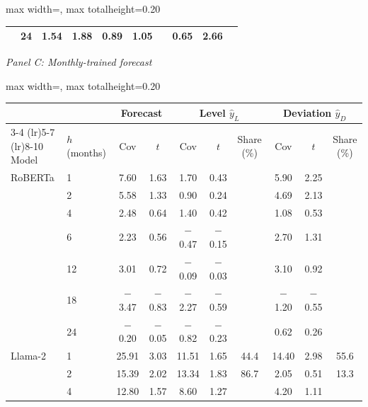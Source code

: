 \begin{table}[htbp]
{\begin{adjustbox}{max width=\linewidth, max totalheight=0.20\textheight}
\begin{tabular}{llcccccccc}
 & 24 & \phantom{$-$}1.54 & \phantom{$-$}1.88 & \phantom{$-$}0.89 & \phantom{$-$}1.05 &  & \phantom{$-$}0.65 & \phantom{$-$}2.66 &  \\
\bottomrule
\end{tabular}
\end{adjustbox}
\par\medskip
\textit{Panel C: Monthly-trained forecast}\\[2pt]
\begin{adjustbox}{max width=\linewidth, max totalheight=0.20\textheight}
\begin{tabular}{llcccccccc}
\toprule
\multicolumn{2}{c}{} & \multicolumn{2}{c}{Forecast} & \multicolumn{3}{c}{Level $\hat y_L$} & \multicolumn{3}{c}{Deviation $\hat y_D$} \\
\cmidrule(lr){3-4} \cmidrule(lr){5-7} \cmidrule(lr){8-10}
Model & $h$ (months) & Cov & $t$ & Cov & $t$ & Share (\%) & Cov & $t$ & Share (\%) \\
\midrule
RoBERTa & 1 & \phantom{$-$0}7.60 & \phantom{$-$}1.63 & \phantom{$-$0}1.70 & \phantom{$-$}0.43 &  & \phantom{$-$0}5.90 & \phantom{$-$}2.25 &  \\
 & 2 & \phantom{$-$0}5.58 & \phantom{$-$}1.33 & \phantom{$-$0}0.90 & \phantom{$-$}0.24 &  & \phantom{$-$0}4.69 & \phantom{$-$}2.13 &  \\
 & 4 & \phantom{$-$0}2.48 & \phantom{$-$}0.64 & \phantom{$-$0}1.40 & \phantom{$-$}0.42 &  & \phantom{$-$0}1.08 & \phantom{$-$}0.53 &  \\
 & 6 & \phantom{$-$0}2.23 & \phantom{$-$}0.56 & \phantom{0}$-$0.47 & $-$0.15 &  & \phantom{$-$0}2.70 & \phantom{$-$}1.31 &  \\
 & 12 & \phantom{$-$0}3.01 & \phantom{$-$}0.72 & \phantom{0}$-$0.09 & $-$0.03 &  & \phantom{$-$0}3.10 & \phantom{$-$}0.92 &  \\
 & 18 & \phantom{0}$-$3.47 & $-$0.83 & \phantom{0}$-$2.27 & $-$0.59 &  & \phantom{0}$-$1.20 & $-$0.55 &  \\
 & 24 & \phantom{0}$-$0.20 & $-$0.05 & \phantom{0}$-$0.82 & $-$0.23 &  & \phantom{$-$0}0.62 & \phantom{$-$}0.26 &  \\
\midrule
Llama-2 & 1 & \phantom{$-$}25.91 & \phantom{$-$}3.03 & \phantom{$-$}11.51 & \phantom{$-$}1.65 & 44.4 & \phantom{$-$}14.40 & \phantom{$-$}2.98 & 55.6 \\
 & 2 & \phantom{$-$}15.39 & \phantom{$-$}2.02 & \phantom{$-$}13.34 & \phantom{$-$}1.83 & 86.7 & \phantom{$-$0}2.05 & \phantom{$-$}0.51 & 13.3 \\
 & 4 & \phantom{$-$}12.80 & \phantom{$-$}1.57 & \phantom{$-$0}8.60 & \phantom{$-$}1.27 &  & \phantom{$-$0}4.20 & \phantom{$-$}1.11 &  \\

\end{tabular}
\end{adjustbox}}
\end{table}
